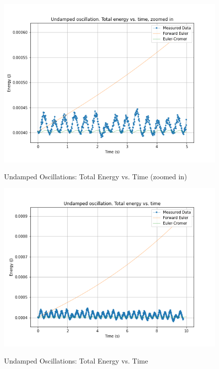 \documentclass[letterpaper,12pt]{article}
\begin{document}
\begin{figure}[H]
  \centering
  \includegraphics[width=0.95\linewidth]{../Fredrik/Undamped oscillation. Total energy vs. time, zoomed in.png}    
  \begin{center}
    \emph{}
  \end{center}
  \caption{Undamped Oscillations: Total Energy vs. Time (zoomed in)}
  \label{undamped-sim-plot}
\end{figure}

\begin{figure}[H]
  \centering
  \includegraphics[width=0.95\linewidth]{../Fredrik/Undamped oscillation. Total energy vs. time.png}    
  \begin{center}
    \emph{}
  \end{center}
  \caption{Undamped Oscillations: Total Energy vs. Time}
  \label{undamped-sim-plot}
\end{figure}
\end{document}
